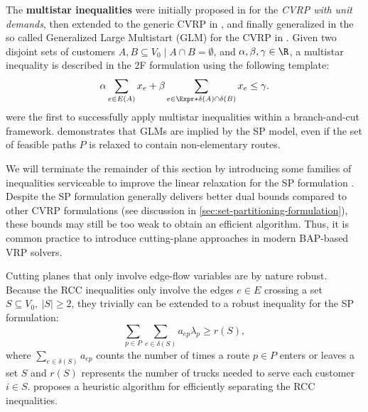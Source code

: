 The \textbf{multistar inequalities} were initially proposed in \textcite{araque1990}
for the \textit{CVRP with unit demands},
then extended to the generic CVRP in \textcite{gouveia1995, achuthan1998},
and finally generalized in the so called Generalized Large Multistart (GLM)
for the CVRP in \textcite{letchford2002,letchford2006}.
Given two disjoint sets of customers $A, B \subseteq V_0 \mid A \cap B = \emptyset$,
and $\alpha, \beta, \gamma \in \R$,
a multistar inequality is described in the 2F formulation using the following template:
\begin{equation}
	\alpha \sum_{e \in E(A)} x_e + \beta \sum_{e \in \Expr*{\delta(A) \cap \delta(B)}} x_e \le \gamma.
\end{equation}
\textcite{araqueg1994} were the first to successfully apply multistar inequalities
within a branch-and-cut framework.
\textcite{letchford2006} demonstrates that GLMs are implied by the SP model,
even if the set of feasible paths $P$ is relaxed to contain non-elementary routes.

\medskip

We will terminate the remainder of this section
by introducing some families of inequalities
serviceable to improve the linear relaxation for the SP formulation
.
Despite the SP formulation generally delivers better dual bounds
compared to other CVRP formulations (see discussion in \cref{sec:set-partitioning-formulation}),
these bounds may still be too weak to obtain an efficient algorithm.
Thus, it is common practice to introduce cutting-plane approaches
in modern BAP-based VRP solvers.

Cutting planes that only involve edge-flow variables are by nature robust.
Because the RCC inequalities only involve the edges
$e \in E$ crossing a set $S \subseteq V_0,\ |S| \ge 2$,
they trivially can be extended to a robust inequality for the SP formulation:
\begin{equation}
	\sum_{p \in P} \sum_{e \in \delta(S)}  a_{ep} \lambda_p \ge r(S),
\end{equation}
where $\sum_{e \in \delta(S)} a_{ep}$ counts the number of times a route $p \in P$
enters or leaves a set $S$
and $r(S)$ represents the number of trucks needed to serve each customer $i \in S$.
\textcite{lysgaard2003cvrpsep} proposes a heuristic algorithm
for efficiently separating the RCC inequalities.

